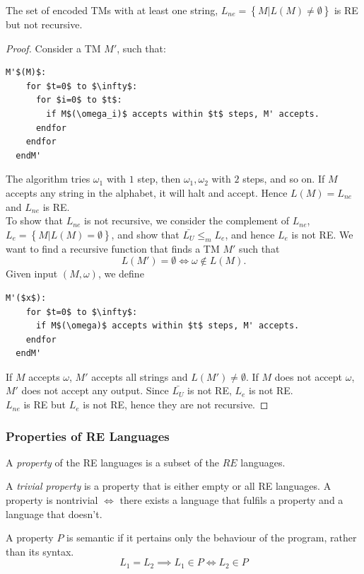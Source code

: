 \begin{example}
  The set of encoded TMs with at least one string, $L_{ne}=\left\{ M|L\left( M
  \right) \neq \emptyset  \right\} $ is RE but not recursive.
\end{example}
\begin{proof}
  Consider a TM $M'$, such that:
  \begin{lstlisting}[mathescape]
  M'$(M)$:
    for $t=0$ to $\infty$:
      for $i=0$ to $t$:
        if M$(\omega_i)$ accepts within $t$ steps, M' accepts.
      endfor
    endfor
  endM'
  \end{lstlisting}
  The algorithm tries $\omega_1$ with $1$ step, then $\omega_1, \omega_2$ with
  $2$ steps, and so on. If $M$ accepts any string in the alphabet, it will halt
  and accept. Hence $L(M)=L_{ne}$ and $L_{ne}$ is RE.\\

  To show that $L_{ne}$ is not recursive, we consider the complement of
  $L_{ne}$, $L_e=\left\{ M|L(M)=\emptyset  \right\} $, and show that
  $\bar{L_U}\le _m L_e$, and hence $L_e$ is not RE. We want to find a recursive
  function that finds a TM $M'$ such that 
  \[L(M')=\emptyset \iff \omega\not\in L(M).\]
  Given input $\left( M,\omega \right) $, we define
  \begin{lstlisting}[mathescape]
  M'($x$):
    for $t=0$ to $\infty$:
      if M$(\omega)$ accepts within $t$ steps, M' accepts.
    endfor
  endM'
  \end{lstlisting}
  If $M$ accepts $\omega$, $M'$ accepts all strings and $L(M')\neq \emptyset $.
  If $M$ does not accept $\omega$, $M'$ does not accept any output.
  Since $\bar{L_U}$ is not RE, $L_{e}$ is not RE.\\

  $L_{ne}$ is RE but $L_e$ is not RE, hence they are not recursive.
\end{proof}


\subsubsection{Properties of RE Languages}
\begin{definition}[Properties]
  A \textit{property} of the RE languages is a subset of the $RE$ languages.
\end{definition}
\begin{definition}
  A \textit{trivial property} is a property that is either empty or all RE
  languages. A property is nontrivial $\iff$ there exists a language that
  fulfils a property and a language that doesn't.
\end{definition}
\begin{definition}
  A property $P$ is semantic if it pertains only the behaviour of the program,
  rather than its syntax. 
  \[L_1=L_2\implies L_1\in P\iff L_2\in P\]
\end{definition}

